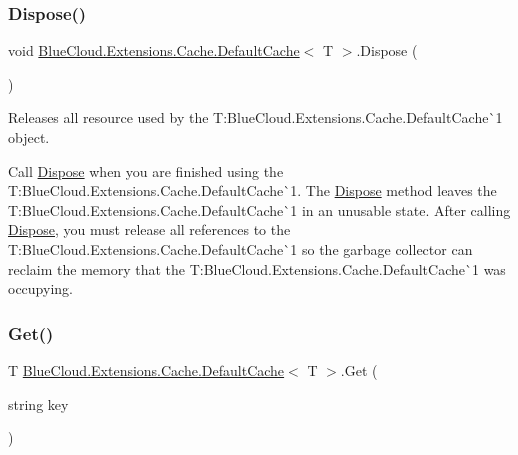 \subsubsection{\texorpdfstring{Dispose()}{Dispose()}}
{\footnotesize\ttfamily void \mbox{\hyperlink{class_blue_cloud_1_1_extensions_1_1_cache_1_1_default_cache}{Blue\+Cloud.\+Extensions.\+Cache.\+Default\+Cache}}$<$ T $>$.Dispose (\begin{DoxyParamCaption}{ }\end{DoxyParamCaption})\hspace{0.3cm}{\ttfamily [inline]}}



Releases all resource used by the T\+:\+Blue\+Cloud.\+Extensions.\+Cache.\+Default\+Cache\`{}1 object. 

Call \mbox{\hyperlink{class_blue_cloud_1_1_extensions_1_1_cache_1_1_default_cache_a4ce78dfa582354a24038b9e94bdd750f}{Dispose}} when you are finished using the T\+:\+Blue\+Cloud.\+Extensions.\+Cache.\+Default\+Cache\`{}1. The \mbox{\hyperlink{class_blue_cloud_1_1_extensions_1_1_cache_1_1_default_cache_a4ce78dfa582354a24038b9e94bdd750f}{Dispose}} method leaves the T\+:\+Blue\+Cloud.\+Extensions.\+Cache.\+Default\+Cache\`{}1 in an unusable state. After calling \mbox{\hyperlink{class_blue_cloud_1_1_extensions_1_1_cache_1_1_default_cache_a4ce78dfa582354a24038b9e94bdd750f}{Dispose}}, you must release all references to the T\+:\+Blue\+Cloud.\+Extensions.\+Cache.\+Default\+Cache\`{}1 so the garbage collector can reclaim the memory that the T\+:\+Blue\+Cloud.\+Extensions.\+Cache.\+Default\+Cache\`{}1 was occupying.\mbox{\label{class_blue_cloud_1_1_extensions_1_1_cache_1_1_default_cache_a93bb4ec6f9ec285c1d13a9f44ed3e48f}} 
\subsubsection{\texorpdfstring{Get()}{Get()}}
{\footnotesize\ttfamily T \mbox{\hyperlink{class_blue_cloud_1_1_extensions_1_1_cache_1_1_default_cache}{Blue\+Cloud.\+Extensions.\+Cache.\+Default\+Cache}}$<$ T $>$.Get (\begin{DoxyParamCaption}\item[{string}]{key }\end{DoxyParamCaption})\hspace{0.3cm}{\ttfamily [inline]}}



